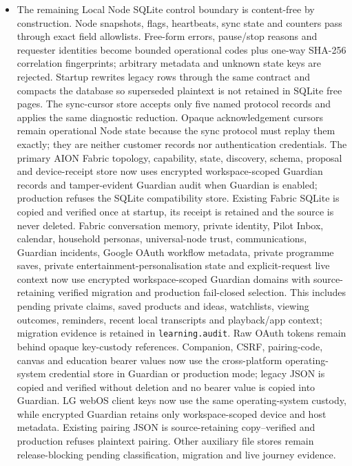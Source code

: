 \documentclass[11pt]{article}
\newcommand{\code}[1]{\texttt{#1}}
\begin{document}
\begin{itemize}
  \item The remaining Local Node SQLite control boundary is content-free by construction. Node snapshots, flags, heartbeats, sync state and counters pass through exact field allowlists. Free-form errors, pause/stop reasons and requester identities become bounded operational codes plus one-way SHA-256 correlation fingerprints; arbitrary metadata and unknown state keys are rejected. Startup rewrites legacy rows through the same contract and compacts the database so superseded plaintext is not retained in SQLite free pages. The sync-cursor store accepts only five named protocol records and applies the same diagnostic reduction. Opaque acknowledgement cursors remain operational Node state because the sync protocol must replay them exactly; they are neither customer records nor authentication credentials. The primary AION Fabric topology, capability, state, discovery, schema, proposal and device-receipt store now uses encrypted workspace-scoped Guardian records and tamper-evident Guardian audit when Guardian is enabled; production refuses the SQLite compatibility store. Existing Fabric SQLite is copied and verified once at startup, its receipt is retained and the source is never deleted. Fabric conversation memory, private identity, Pilot Inbox, calendar, household personas, universal-node trust, communications, Guardian incidents, Google OAuth workflow metadata, private programme saves, private entertainment-personalisation state and explicit-request live context now use encrypted workspace-scoped Guardian domains with source-retaining verified migration and production fail-closed selection. This includes pending private claims, saved products and ideas, watchlists, viewing outcomes, reminders, recent local transcripts and playback/app context; migration evidence is retained in \code{learning.audit}. Raw OAuth tokens remain behind opaque key-custody references. Companion, CSRF, pairing-code, canvas and education bearer values now use the cross-platform operating-system credential store in Guardian or production mode; legacy JSON is copied and verified without deletion and no bearer value is copied into Guardian. LG webOS client keys now use the same operating-system custody, while encrypted Guardian retains only workspace-scoped device and host metadata. Existing pairing JSON is source-retaining copy--verified and production refuses plaintext pairing. Other auxiliary file stores remain release-blocking pending classification, migration and live journey evidence.

\end{itemize}
\end{document}
